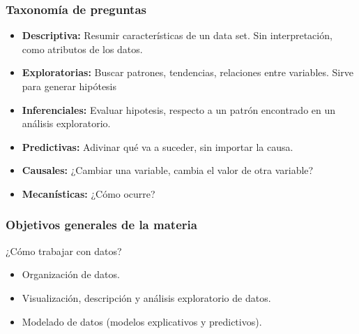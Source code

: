 \documentclass[aspectratio=169,12pt]{beamer}
\begin{document}
\begin{frame}
\frametitle{Taxonomía de preguntas}

\begin{itemize}
\item \textbf{Descriptiva:} Resumir características de un data set. Sin interpretación, como atributos de los datos.
\item \textbf{Exploratorias:} Buscar patrones, tendencias, relaciones entre variables. Sirve para generar hipótesis
\item \textbf{Inferenciales:} Evaluar hipotesis, respecto a un patrón encontrado en un análisis exploratorio.
\item \textbf{Predictivas:} Adivinar qué va a suceder, sin importar la causa.
\item \textbf{Causales:} ¿Cambiar una variable, cambia el valor de otra variable?
\item \textbf{Mecanísticas:} ¿Cómo ocurre?
\end{itemize}

\end{frame}


\begin{frame}
\frametitle{Objetivos generales de la materia}

¿Cómo trabajar con datos?

\begin{itemize}
\item Organización de datos.
\item Visualización, descripción y análisis exploratorio de datos.
\item Modelado de datos (modelos explicativos y predictivos).
\end{itemize}

\end{frame}

\end{document}
